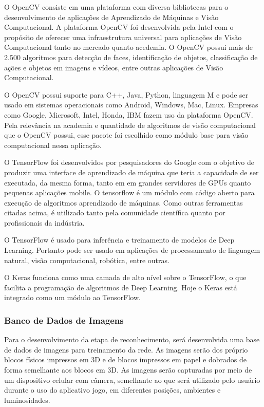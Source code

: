         O OpenCV consiste em uma plataforma com diversa bibliotecas para o desenvolvimento de aplicações de Aprendizado de Máquinas e Visão Computacional. A plataforma OpenCV foi desenvolvida pela Intel com o propósito de oferecer uma infraestrutura universal para aplicações de Visão Computacional tanto no mercado quanto acedemia. O OpenCV possui mais de 2.500 algoritmos para detecção de faces, identificação de objetos, classificação de ações e objetos em imagens e vídeos, entre outras aplicações de Visão Computacional.
        
        O OpenCV possui suporte para C++, Java, Python, linguagem M e pode ser usado em sistemas operacionais como Android, Windows, Mac, Linux. Empresas como Google, Microsoft, Intel, Honda,  IBM fazem uso da plataforma OpenCV. Pela relevância na academia e quantidade de algoritmos de visão computacional que o OpenCV possui, esse pacote foi escolhido como módulo base para visão computacional nessa aplicação.
        
         O TensorFlow foi desenvolvidos por pesquisadores do Google com o objetivo de produzir uma interface de aprendizado de máquina que teria a capacidade de ser executada, da mesma forma, tanto em em grandes servidores de GPUs quanto pequenas aplicações mobile. O tensorflow é um módulo com código aberto para execução de algoritmos aprendizado de máquinas. Como outras ferramentas citadas acima, é utilizado tanto pela comunidade científica quanto por profissionais da indústria.
         
        O TensorFlow é usado para inferência e treinamento de modelos de Deep Learning. Portanto pode ser usado em aplicações de processamento de linguagem natural, visão computacional, robótica, entre outras.
        
        O Keras funciona como uma camada de alto nível sobre o TensorFlow, o que facilita a programação de algoritmos de Deep Learning. Hoje o Keras está integrado como um módulo ao TensorFlow.  

    
       \subsubsection{Banco de Dados de Imagens}    
        
        Para o desenvolvimento da etapa de reconhecimento, será desenvolvida uma base de dados de imagens para treinamento da rede. As imagens serão dos próprio blocos físicos impressos em 3D e de blocos impressos em papel e dobrados de forma semelhante aos blocos em 3D.	As imagens serão capturadas por meio de um dispositivo celular com câmera, semelhante ao que será utilizado pelo usuário durante o uso do aplicativo jogo, em diferentes posições, ambientes e luminosidades. 
        
